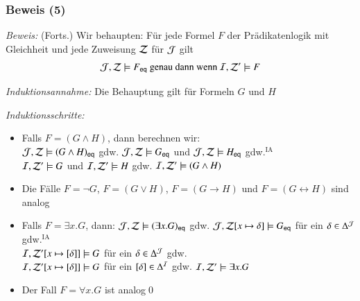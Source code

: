 \documentclass[onlymath]{beamer}
\begin{document}
\begin{frame}[t]\frametitle{Beweis (5)}


\emph{Beweis:} {\footnotesize(Forts.)}
Wir behaupten: Für jede Formel $F$ der Prädikatenlogik mit Gleichheit und jede Zuweisung $\mathcal{Z}$ für $\mathcal{J}$ gilt
\[ \mathcal{J},\mathcal{Z}\models F_{\textsf{eq}} \text{ genau dann wenn } \mathcal{I},\mathcal{Z}'\models F \]


\emph{Induktionsannahme:} Die Behauptung gilt für Formeln $G$ und $H$ \medskip\pause

\emph{Induktionsschritte:}
\begin{itemize}
\item Falls $F=(G\wedge H)$, dann berechnen wir:\pause\\
$\mathcal{J},\mathcal{Z}\models (G\wedge H)_{\textsf{eq}}$
\alert{gdw.} $\mathcal{J},\mathcal{Z}\models G_{\textsf{eq}}$ und $\mathcal{J},\mathcal{Z}\models H_{\textsf{eq}}$ \pause\alert{gdw.${}^{\text{IA}}$}\\
$\mathcal{I},\mathcal{Z}'\models G$ und $\mathcal{I},\mathcal{Z}'\models H$ \pause\alert{gdw.} $\mathcal{I},\mathcal{Z}'\models (G\wedge H)$\pause
\item Die Fälle $F=\neg G$, $F=(G\vee H)$, $F=(G\to H)$ und $F=(G\leftrightarrow H)$ sind analog\pause
\item Falls $F=\exists x.G$, dann: $\mathcal{J},\mathcal{Z}\models (\exists x.G)_{\textsf{eq}}$ \alert{gdw.}
$\mathcal{J},\mathcal{Z}[x\mapsto \delta]\models G_{\textsf{eq}}$ für ein $\delta\in\Delta^{\mathcal{J}}$
\pause\alert{gdw.${}^{\text{IA}}$}\\
$\mathcal{I},\mathcal{Z}'[x\mapsto [\delta]]\models G$ für ein $\delta\in\Delta^{\mathcal{J}}$
 \pause\alert{gdw.}\\
 $\mathcal{I},\mathcal{Z}'[x\mapsto [\delta]]\models G$ für ein $[\delta]\in\Delta^{\mathcal{I}}$
\alert{gdw.} $\mathcal{I},\mathcal{Z}'\models \exists x.G$\pause
\item Der Fall $F=\forall x.G$ ist analog\qed
\end{itemize}
\end{frame}
\end{document}
